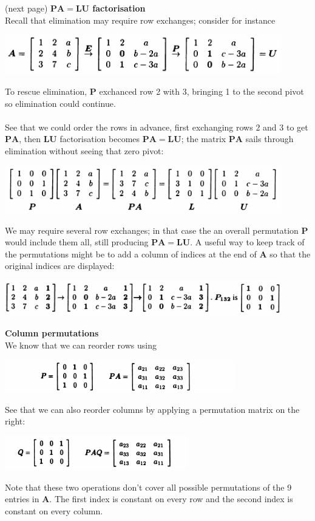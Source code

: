 \documentclass{report}
\begin{document}
(next page)\newpage
\noindent\textbf{$\bm{PA}=\bm{LU}$ factorisation}\\
Recall that elimination may require row exchanges; consider for instance
\begin{center}
\includegraphics[width=12cm]{15}
\end{center}
To rescue elimination, $\bm P$ exchanced row 2 with 3, bringing 1 to the second pivot so elimination could continue.\\
\vspace{1mm}\\
See that we could order the rows in advance, first exchanging rows 2 and 3 to get $\bm{PA}$, then $\bm{LU}$ factorisation becomes $\bm{PA}=\bm{LU}$; the matrix
$\bm{PA}$ sails through elimination without seeing that zero pivot:
\begin{center}
\includegraphics[width=12cm]{16}
\end{center}
We may require several row exchanges; in that case the an overall permutation $\bm P$ would include them all, still producing $\bm{PA}=\bm{LU}$. A useful way to keep
track of the permutations might be to add a column of indices at the end of $\bm A$ so that the original indices are displayed:
\begin{center}
\includegraphics[width=12cm]{17}
\end{center}
\textbf{Column permutations}\\
We know that we can reorder rows using 
\begin{center}
\includegraphics[width=10cm]{18}
\end{center}
See that we can also reorder columns by applying a permutation matrix on the right:
\begin{center}
\includegraphics[width=8cm]{19}
\end{center}
Note that these two operations don't cover all possible permutations of the 9 entries in $\bm A$. The first index is constant on every row and the second index is
constant on every column.
\newpage
\end{document}
